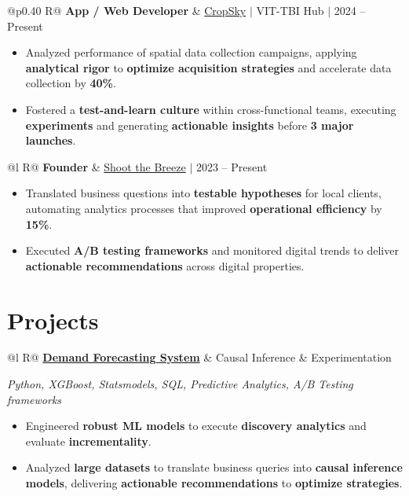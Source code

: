 \documentclass[a4paper,10pt]{article}
\newcommand{\ulink}[2]{\href{#1}{#2}}
\newcommand{\subheading}[1]{{\color[HTML]{0A0A0A}\fontsize{12}{14}\selectfont\bfseries #1}}
\newcommand{\techstack}[1]{{\color[HTML]{5C5C5C}\fontsize{10.5}{12.5}\selectfont\itshape #1}}
\newcommand{\meta}[1]{{\color[HTML]{5C5C5C}\fontsize{10.5}{12.5}\selectfont #1}}
\begin{document}
\begin{tabularx}{\linewidth}{@{}p{0.40\linewidth} R@{}}
\subheading{App / Web Developer} & \meta{\ulink{https://sites.google.com/view/cropsky/home}{CropSky} $|$ VIT-TBI Hub $|$ 2024 -- Present}
\end{tabularx}
\begin{itemize}[nosep, leftmargin=1.5em, itemsep=2pt, topsep=2pt]
  \item {\color[HTML]{0A0A0A}\fontsize{11}{14}\selectfont Analyzed performance of spatial data collection campaigns, applying \textbf{analytical rigor} to \textbf{optimize acquisition strategies} and accelerate data collection by \textbf{40\%}.}
  \item {\color[HTML]{0A0A0A}\fontsize{11}{14}\selectfont Fostered a \textbf{test-and-learn culture} within cross-functional teams, executing \textbf{experiments} and generating \textbf{actionable insights} before \textbf{3 major launches}.}
\end{itemize}

\begin{tabularx}{\linewidth}{@{}l R@{}}
\subheading{Founder} & \meta{\ulink{https://shoot-the-breeze.vercel.app}{Shoot the Breeze} $|$ 2023 -- Present}
\end{tabularx}
\begin{itemize}[nosep, leftmargin=1.5em, itemsep=2pt, topsep=2pt]
  \item {\color[HTML]{0A0A0A}\fontsize{11}{14}\selectfont Translated business questions into \textbf{testable hypotheses} for local clients, automating analytics processes that improved \textbf{operational efficiency} by \textbf{15\%}.}
  \item {\color[HTML]{0A0A0A}\fontsize{11}{14}\selectfont Executed \textbf{A/B testing frameworks} and monitored digital trends to deliver \textbf{actionable recommendations} across digital properties.}
\end{itemize}

\section{Projects}
\vspace{2pt}

\begin{tabularx}{\linewidth}{@{}l R@{}}
\subheading{\ulink{https://github.com/su-jin1425/Demand-Forecasting-System}{Demand Forecasting System}} & \meta{Causal Inference \& Experimentation}
\end{tabularx}
\techstack{Python, XGBoost, Statsmodels, SQL, Predictive Analytics, A/B Testing frameworks}
\begin{itemize}[nosep, leftmargin=1.5em, itemsep=2pt, topsep=2pt]
  \item {\color[HTML]{0A0A0A}\fontsize{11}{14}\selectfont Engineered \textbf{robust ML models} to execute \textbf{discovery analytics} and evaluate \textbf{incrementality}.}
  \item {\color[HTML]{0A0A0A}\fontsize{11}{14}\selectfont Analyzed \textbf{large datasets} to translate business queries into \textbf{causal inference models}, delivering \textbf{actionable recommendations} to \textbf{optimize strategies}.}
\end{itemize}
\end{document}
